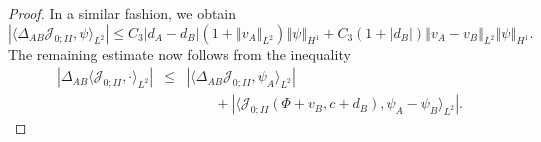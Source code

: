 \documentclass[10pt]{articleHJ}
\newcommand{\abs}[1]{\left\vert#1\right\vert}			%
\newcommand{\norm}[1]{\left\Vert#1\right\Vert}		%
\numberwithin{equation}{section}
\begin{document}
\begin{proof}
In a similar fashion, we obtain
\begin{equation}
\abs{
 \langle
  \Delta_{AB} \mathcal{J}_{0;II},
  \psi \rangle_{L^2}
}
\le C_3 \abs{d_A - d_B} ( 1 + \norm{v_A}_{L^2} )
    \norm{\psi}_{H^1}
+ C_3 (1 + \abs{d_B} )\norm{v_A - v_B}_{L^2}
    \norm{\psi}_{H^1}.
\end{equation}
The remaining estimate
now follows from the inequality
\begin{equation}
\begin{array}{lcl}
\abs{
  \Delta_{AB} \langle \mathcal{J}_{0;II}, \cdot \rangle_{L^2}
}
& \le &
\abs{\langle \Delta_{AB} \mathcal{J}_{0;II}
 , \psi_A \rangle_{L^2} }
\\[0.2cm]
& & \qquad
  + \abs{
    \langle \mathcal{J}_{0;II}(\Phi + v_B, c + d_B ),
       \psi_A - \psi_B
    \rangle_{L^2} } .
\end{array}
\end{equation}
\end{proof}
\end{document}
